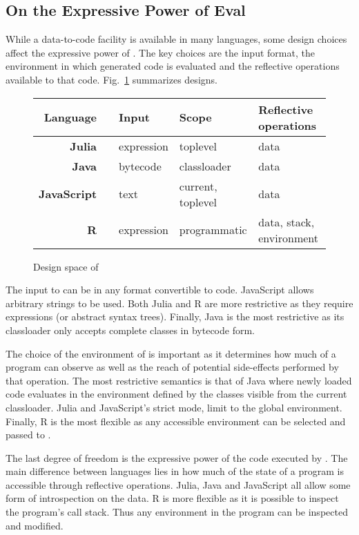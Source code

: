 \documentclass[review,nonacm,screen,acmsmall,anonymous=true]{acmart}
\begin{document}
\subsection{On the Expressive Power of Eval}

While a data-to-code facility is available in many languages, some design
choices affect the expressive power of \eval. The key choices are the input
format, the environment in which generated code is evaluated and the reflective
operations available to that code. Fig.~\ref{comp} summarizes designs.

\begin{figure}[!h]\center\small\begin{tabular}{r@{~}l|l|l|l}\hline
\tiny\sc Language&&\sc\tiny Input&\sc\tiny Scope&\tiny\sc Reflective operations\\\hline
\bf Julia&\cite{julia}     & expression& toplevel         & data\\
\bf Java&\cite{cl}  & bytecode  & classloader       & data\\
\bf JavaScript&\cite{ecoop11}& text      & current, toplevel& data\\
\bf R&\cite{R96}  & expression& programmatic      & data, stack, environment\\\hline
\end{tabular}\caption{Design space of \eval}\label{comp}
\end{figure}

The input to \eval can be in any format convertible to code. JavaScript allows
arbitrary strings to be used. Both Julia and R are more restrictive as they
require expressions (or abstract syntax trees). Finally, Java is the most
restrictive as its classloader only accepts complete classes in bytecode form.

The choice of the environment of \eval is important as it determines how much of
a program \eval can observe as well as the reach of potential side-effects
performed by that operation. The most restrictive semantics is that of Java
where newly loaded code evaluates in the environment defined by the classes
visible from the current classloader. Julia and JavaScript's strict mode, limit
\eval to the global environment. Finally, R is the most flexible as any
accessible environment can be selected and passed to \eval.

The last degree of freedom is the expressive power of the code executed by
\eval. The main difference between languages lies in how much of the state of a
program is accessible through reflective operations. Julia, Java and JavaScript
all allow some form of introspection on the data. R is more flexible as it is
possible to inspect the program's call stack. Thus any environment in the
program can be inspected and modified.
\end{document}
